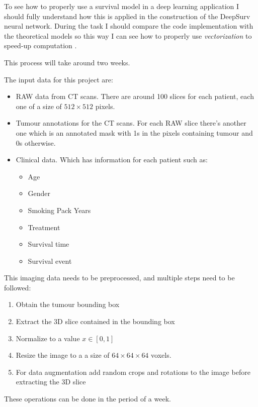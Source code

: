 To see how to properly use a survival model in a deep learning application I should fully 
understand how this is applied in the construction of the DeepSurv neural network. During 
the task I should compare the code implementation with the theoretical models so this way
I can see how to properly use \emph{vectorization} to speed-up computation
\cites{medical:cox}{medical:deep-surv}.

This process will take around two weeks.


The input data for this project are:
\begin{itemize}
  \item RAW data from \gls{CT} scans. There are around 100 slices for each patient, each one of 
  a size of \( 512 \times 512 \) pixels.
  \item Tumour annotations for the CT scans. For each RAW slice there's another one which is an
  annotated mask with 1s in the pixels containing tumour and 0s otherwise.
  \item Clinical data. Which has information for each patient such as:
  \begin{itemize}
    \item Age
    \item Gender
    \item Smoking Pack Years
    \item Treatment
    \item Survival time
    \item Survival event
  \end{itemize}
\end{itemize}

This imaging data needs to be preprocessed, and multiple steps need to be followed:

\begin{enumerate}
  \item Obtain the tumour bounding box
  \item Extract the 3D slice contained in the bounding box
  \item Normalize to a value \( x \in [0, 1] \)
  \item Resize the image to a a size of \( 64 \times 64 \times 64 \) voxels.
  \item For data augmentation add random crops and rotations to the image before extracting the 3D
  slice
\end{enumerate}

These operations can be done in the period of a week.

